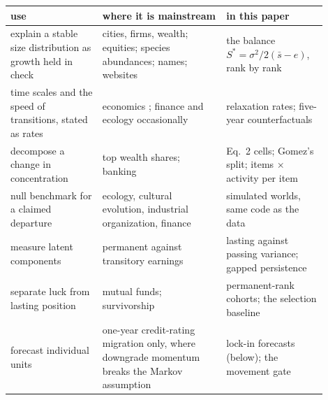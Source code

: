 \documentclass[10pt]{article}
\begin{document}
\begin{center}\footnotesize\begin{tabular}{>{\raggedright\arraybackslash}p{0.26\linewidth}>{\raggedright\arraybackslash}p{0.35\linewidth}>{\raggedright\arraybackslash}p{0.29\linewidth}}
\toprule
use & where it is mainstream & in this paper\\
\midrule
explain a stable size distribution as growth held in check & cities, firms, wealth; equities; species abundances; names; websites \cite{gabaix1999,fernholz2002,banner2005,huberman1999} & the balance $S^\ast = \sigma^2/2(\bar s - e)$, rank by rank \\
time scales and the speed of transitions, stated as rates & economics \cite{gllm2016,barro1992}; finance and ecology occasionally & relaxation rates; five-year counterfactuals \\
decompose a change in concentration & top wealth shares; banking \cite{gomez2023,fernholzkoch2016} & Eq.~2 cells; Gomez's split; items $\times$ activity per item \\
null benchmark for a claimed departure & ecology, cultural evolution, industrial organization, finance \cite{sutton2007,fama2010,acerbi2014} & simulated worlds, same code as the data \\
measure latent components & permanent against transitory earnings \cite{abowd1989,guvenen2009} & lasting against passing variance; gapped persistence \\
separate luck from lasting position & mutual funds; survivorship \cite{fama2010,brown1992} & permanent-rank cohorts; the selection baseline \\
forecast individual units & one-year credit-rating migration only, where downgrade momentum breaks the Markov assumption \cite{lando2002} & lock-in forecasts (below); the movement gate \\
\bottomrule
\end{tabular}\end{center}
\end{document}
